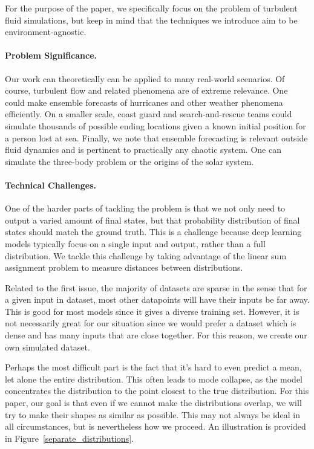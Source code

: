 \documentclass{article}
\begin{document}
For the purpose of the paper, we specifically focus on the problem of turbulent fluid simulations, but keep in mind that the techniques we introduce aim to be environment-agnostic.
\paragraph{Problem Significance.}
Our work can theoretically can be applied to many real-world scenarios. Of course, turbulent flow and related phenomena are of extreme relevance. One could make ensemble forecasts of hurricanes and other weather phenomena efficiently. On a smaller scale, coast guard and search-and-rescue teams could simulate thousands of possible ending locations given a known initial position for a person lost at sea. Finally, we note that ensemble forecasting is relevant outside fluid dynamics and is pertinent to practically any chaotic system. One can simulate the three-body problem or the origins of the solar system.
\paragraph{Technical Challenges.}
One of the harder parts of tackling the problem is that we not only need to output a varied amount of final states, but that probability distribution of final states should match the ground truth. This is a challenge because deep learning models typically focus on a single input and output, rather than a full distribution. We tackle this challenge by taking advantage of the linear sum assignment problem to measure distances between distributions.

Related to the first issue, the majority of datasets are sparse in the sense that for a given input in dataset, most other datapoints will have their inputs be far away. This is good for most models since it gives a diverse training set. However, it is not necessarily great for our situation since we would prefer a dataset which is dense and has many inputs that are close together. For this reason, we create our own simulated dataset.

Perhaps the most difficult part is the fact that it's hard to even predict a mean, let alone the entire distribution. This often leads to mode collapse, as the model concentrates the distribution to the point closest to the true distribution. For this paper, our goal is that even if we cannot make the distributions overlap, we will try to make their shapes as similar as possible. This may not always be ideal in all circumstances, but is nevertheless how we proceed. An illustration is provided in Figure~\ref{separate_distributions}.
\end{document}
